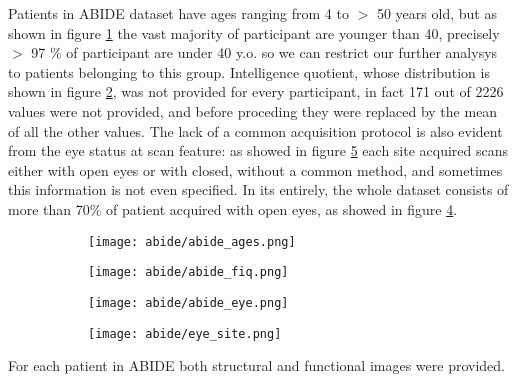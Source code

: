 \documentclass[a4paper,11pt]{article}
\begin{document}
Patients in ABIDE dataset have ages ranging from 4 to $>$ 50 years old, but as shown in figure \ref{fig:abideages} the vast majority of participant are younger than 40, precisely $>$ 97 $\%$ of participant are under 40 y.o. so we can restrict our further analysys to patients belonging to this group.
Intelligence quotient, whose distribution is shown in figure \ref{fig:abidefiq}, was not provided for every participant, in fact 171 out of 2226 values were not provided, and before proceding they were replaced by the mean of all the other values.
The lack of a common acquisition protocol is also evident from the eye status at scan feature: as showed in figure \ref{fig:abideeyesite} each site acquired scans either with open eyes or with closed, without a common method, and sometimes this information is not even specified.
In its entirely, the whole dataset consists of more than 70\% of patient acquired with open eyes, as showed in figure \ref{fig:abideeye}.




\begin{figure}
\begin{subfigure}{0.5\textwidth}
\texttt{[image: abide/abide\_ages.png]}
\caption{}
\label{fig:abideages}
\end{subfigure}
\begin{subfigure}{0.5\textwidth}
\texttt{[image: abide/abide\_fiq.png]}
\caption{}
\label{fig:abidefiq}
\end{subfigure}

\caption{}
\label{}
\end{figure}



\begin{figure}
\begin{subfigure}{0.4\linewidth}
\texttt{[image: abide/abide\_eye.png]}
\caption{}
\label{fig:abideeye}
\end{subfigure}
\begin{subfigure}{0.7\linewidth}
\texttt{[image: abide/eye\_site.png]}
\caption{}
\label{fig:abideeyesite}
\end{subfigure}
\hspace{0.1 cm}
\caption{}
\label{}
\end{figure}


For each patient in ABIDE both structural and functional images were provided.
\end{document}
